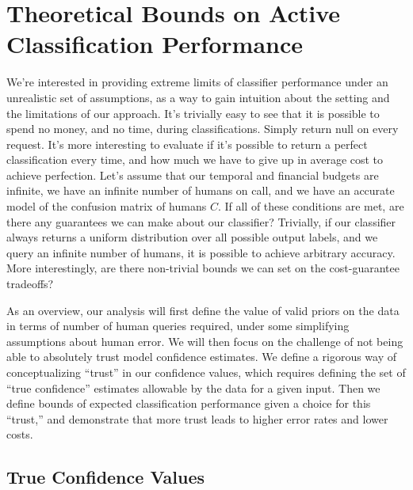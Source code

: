\section{Theoretical Bounds on Active Classification Performance}
\label{sec:bounds}

We're interested in providing extreme limits of classifier performance under an unrealistic set of assumptions, as a way to gain intuition about the setting and the limitations of our approach.
It's trivially easy to see that it is possible to spend no money, and no time, during classifications. Simply return null on every request.
It's more interesting to evaluate if it's possible to return a perfect classification every time, and how much we have to give up in average cost to achieve perfection.
Let's assume that our temporal and financial budgets are infinite, we have an infinite number of humans on call, and we have an accurate model of the confusion matrix of humans $C$.
If all of these conditions are met, are there any guarantees we can make about our classifier?
Trivially, if our classifier always returns a uniform distribution over all possible output labels, and we query an infinite number of humans, it is possible to achieve arbitrary accuracy.
More interestingly, are there non-trivial bounds we can set on the cost-guarantee tradeoffs?

As an overview, our analysis will first define the value of valid priors on the data in terms of number of human queries required, under some simplifying assumptions about human error.
We will then focus on the challenge of not being able to absolutely trust model confidence estimates.
We define a rigorous way of conceptualizing ``trust'' in our confidence values, which requires defining the set of ``true confidence'' estimates allowable by the data for a given input.
Then we define bounds of expected classification performance given a choice for this ``trust,'' and demonstrate that more trust leads to higher error rates and lower costs.

\subsection{True Confidence Values}

